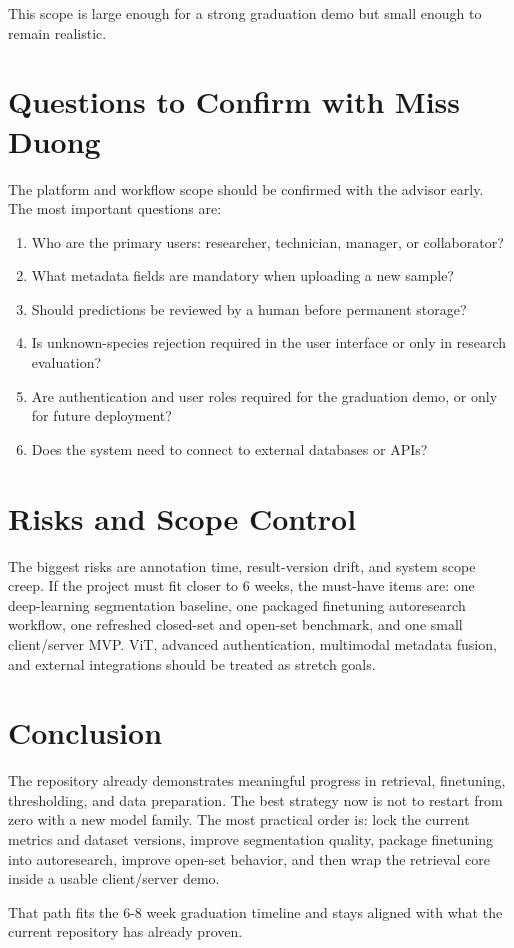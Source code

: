 \documentclass[11pt]{article}
\begin{document}
This scope is large enough for a strong graduation demo but small enough to remain realistic.

\section{Questions to Confirm with Miss Duong}

The platform and workflow scope should be confirmed with the advisor early. The most important
questions are:

\begin{enumerate}
  \item Who are the primary users: researcher, technician, manager, or collaborator?
  \item What metadata fields are mandatory when uploading a new sample?
  \item Should predictions be reviewed by a human before permanent storage?
  \item Is unknown-species rejection required in the user interface or only in research evaluation?
  \item Are authentication and user roles required for the graduation demo, or only for future deployment?
  \item Does the system need to connect to external databases or APIs?
\end{enumerate}

\section{Risks and Scope Control}

The biggest risks are annotation time, result-version drift, and system scope creep.
If the project must fit closer to 6 weeks, the must-have items are: one deep-learning
segmentation baseline, one packaged finetuning autoresearch workflow, one refreshed
closed-set and open-set benchmark, and one small client/server MVP. ViT, advanced
authentication, multimodal metadata fusion, and external integrations should be treated
as stretch goals.

\section{Conclusion}

The repository already demonstrates meaningful progress in retrieval, finetuning,
thresholding, and data preparation. The best strategy now is not to restart from zero
with a new model family. The most practical order is: lock the current metrics and dataset
versions, improve segmentation quality, package finetuning into autoresearch, improve open-set
behavior, and then wrap the retrieval core inside a usable client/server demo.

That path fits the 6-8 week graduation timeline and stays aligned with what the current
repository has already proven.
\end{document}
